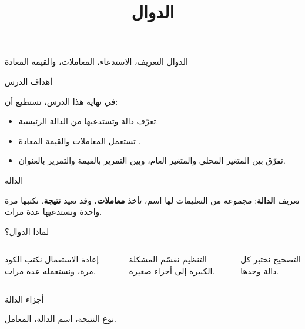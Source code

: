 \documentclass[aspectratio=169, 11pt, t, xcolor={table}]{beamer}
\title{الدوال}
\begin{document}
{الدوال}
{التعريف، الاستدعاء، المعاملات، والقيمة المعادة}

\begin{frame}{أهداف الدرس}
    \begin{tbox}{\faBullseye\quad في نهاية هذا الدرس، تستطيع أن:}
        \begin{itemize}
            \item تعرّف دالة وتستدعيها من الدالة الرئيسية.
            \item تستعمل المعاملات والقيمة المعادة .
            \item تفرّق بين المتغير المحلي والمتغير العام، وبين التمرير بالقيمة والتمرير بالعنوان.
        \end{itemize}
    \end{tbox}
\end{frame}

\begin{frame}{الدالة}
    \begin{tbox}{\faLightbulb\quad تعريف}
        \textbf{الدالة}: مجموعة من التعليمات لها اسم، تأخذ \textbf{معاملات}، وقد تعيد \textbf{نتيجة}. نكتبها مرة واحدة ونستدعيها عدة مرات.
    \end{tbox}
\end{frame}

\begin{frame}{لماذا الدوال؟}
    \vspace{0.6cm}
    \begin{columns}[T]
        \begin{card}{إعادة الاستعمال}
            نكتب الكود مرة، ونستعمله عدة مرات.
        \end{card}
        \begin{card}{التنظيم}
            نقسّم المشكلة الكبيرة إلى أجزاء صغيرة.
        \end{card}
        \begin{card}{التصحيح}
            نختبر كل دالة وحدها.
        \end{card}
    \end{columns}
\end{frame}

\begin{frame}{أجزاء الدالة}
    \begin{center}
    \begin{minipage}{0.72\textwidth}
    \end{minipage}
    \end{center}
    \vspace{0.3cm}
     نوع النتيجة،  اسم الدالة،  المعامل.
\end{frame}
\end{document}
